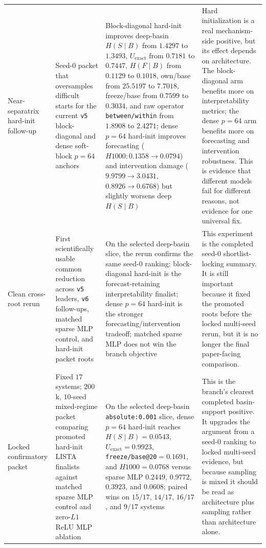\documentclass[11pt]{article}
\begin{document}
\begin{table}[t]
\begin{tabular}{p{2.6cm} p{2.8cm} p{4.0cm} p{5.0cm}}
\addlinespace
Near-separatrix hard-init follow-up & Seed-$0$ packet that oversamples difficult starts for the current \texttt{v5} block-diagonal and dense soft-block $p=64$ anchors & Block-diagonal hard-init improves deep-basin $H(S \mid B)$ from $1.4297$ to $1.3493$, $U_{\text{exact}}$ from $0.7181$ to $0.7447$, $H(F \mid B)$ from $0.1129$ to $0.1018$, own/base from $25.5197$ to $7.7018$, freeze/base from $0.7599$ to $0.3034$, and raw operator \texttt{between/within} from $1.8908$ to $2.4271$; dense $p=64$ hard-init improves forecasting ($H1000: 0.1358 \rightarrow 0.0794$) and intervention damage ($9.9799 \rightarrow 3.0431$, $0.8926 \rightarrow 0.6768$) but slightly worsens deep $H(S \mid B)$ & Hard initialization is a real mechanism-side positive, but its effect depends on architecture. The block-diagonal arm benefits more on interpretability metrics; the dense $p=64$ arm benefits more on forecasting and intervention robustness. This is evidence that different models fail for different reasons, not evidence for one universal fix. \\
\addlinespace
Clean cross-root rerun & First scientifically usable common reduction across \texttt{v5} leaders, \texttt{v6} follow-ups, matched sparse MLP control, and hard-init packet roots & On the selected deep-basin slice, the rerun confirms the same seed-$0$ ranking: block-diagonal hard-init is the forecast-retaining interpretability finalist; dense $p=64$ hard-init is the stronger forecasting/intervention tradeoff; matched sparse MLP does not win the branch objective & This experiment is the completed seed-$0$ shortlist-locking summary. It is still important because it fixed the promoted roots before the locked multi-seed rerun, but it is no longer the final paper-facing comparison. \\
\addlinespace
Locked confirmatory packet & Fixed $17$ systems; $200$k, $10$-seed mixed-regime packet comparing promoted hard-init LISTA finalists against matched sparse MLP control and zero-$L1$ ReLU MLP ablation & On the selected deep-basin \texttt{absolute:0.001} slice, dense $p=64$ hard-init reaches $H(S \mid B)=0.0543$, $U_{\text{exact}}=0.9923$, \texttt{freeze/base@20}$=0.1691$, and $H1000=0.0768$ versus sparse MLP $0.2449$, $0.9772$, $0.3923$, and $0.0608$; paired wins on $15/17$, $14/17$, $16/17$, and $9/17$ systems & This is the branch's clearest completed basin-support positive. It upgrades the argument from a seed-$0$ ranking to locked multi-seed evidence, but because sampling is mixed it should be read as architecture plus sampling rather than architecture alone. \\

\end{tabular}
\end{table}
\end{document}
